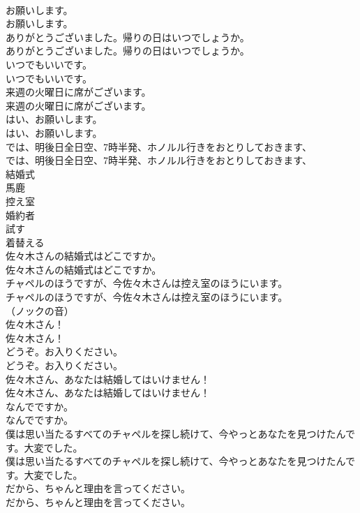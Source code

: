 \documentclass[8pt]{extreport}
\begin{document}
\begin{CJK}{UTF8}{min}
\\	お願いします。	
\\	お願いします。 
\\	ありがとうございました。帰りの日はいつでしょうか。	
\\	ありがとうございました。帰りの日はいつでしょうか。 
\\	いつでもいいです。	
\\	いつでもいいです。 
\\	来週の火曜日に席がございます。	
\\	来週の火曜日に席がございます。 
\\	はい、お願いします。	
\\	はい、お願いします。 
\\	では、明後日全日空、7時半発、ホノルル行きをおとりしておきます、	
\\	では、明後日全日空、7時半発、ホノルル行きをおとりしておきます、 
\\	結婚式
\\	馬鹿
\\	控え室
\\	婚約者
\\	試す
\\	着替える
\\	佐々木さんの結婚式はどこですか。	
\\	佐々木さんの結婚式はどこですか。 
\\	チャペルのほうですが、今佐々木さんは控え室のほうにいます。	
\\	チャペルのほうですが、今佐々木さんは控え室のほうにいます。 
\\	（ノックの音）	
\\	佐々木さん！	
\\	佐々木さん！ 
\\	どうぞ。お入りください。	
\\	どうぞ。お入りください。 
\\	佐々木さん、あなたは結婚してはいけません！	
\\	佐々木さん、あなたは結婚してはいけません！ 
\\	なんでですか。	
\\	なんでですか。 
\\	僕は思い当たるすべてのチャペルを探し続けて、今やっとあなたを見つけたんです。大変でした。	
\\	僕は思い当たるすべてのチャペルを探し続けて、今やっとあなたを見つけたんです。大変でした。 
\\	だから、ちゃんと理由を言ってください。	
\\	だから、ちゃんと理由を言ってください。 

\end{CJK}
\end{document}
